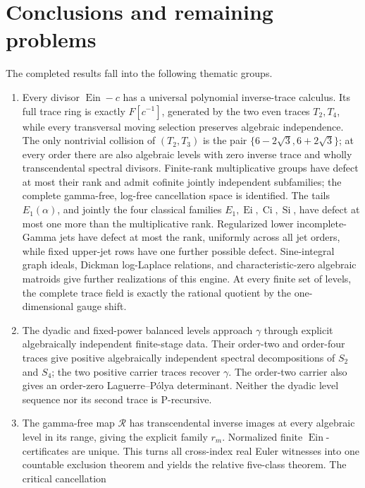 \documentclass[11pt]{article}
\theoremstyle{definition}
\theoremstyle{remark}
\newcommand{\Ein}{\operatorname{Ein}}
\newcommand{\Ei}{\operatorname{Ei}}
\newcommand{\Ci}{\operatorname{Ci}}
\begin{document}
\section{Conclusions and remaining problems}
\label{sec:conclusion}

The completed results fall into the following thematic groups.
\begin{enumerate}[label=\textup{(\arabic*)}]
 \item Every divisor \(\Ein-c\) has a universal polynomial inverse-trace
 calculus.  Its full trace ring is exactly \(F[c^{-1}]\), generated by the
 two even traces \(T_2,T_4\), while every transversal moving selection
 preserves algebraic independence.  The only nontrivial collision of
 \((T_2,T_3)\) is the pair \(\{6-2\sqrt3,6+2\sqrt3\}\); at every order
 there are also algebraic levels with zero inverse trace and wholly
 transcendental spectral divisors.  Finite-rank multiplicative groups have
 defect at most their rank and admit cofinite jointly independent
 subfamilies; the complete gamma-free, log-free cancellation space is
 identified.  The tails \(E_1(\alpha)\), and jointly the four classical
 families \(E_1,\Ei,\Ci,\operatorname{Si}\), have defect at most one more
 than the multiplicative rank.  Regularized lower incomplete-Gamma jets
 have defect at most the rank, uniformly across all jet orders, while fixed
 upper-jet rows have one further possible defect.  Sine-integral graph
 ideals, Dickman log-Laplace relations, and characteristic-zero algebraic
 matroids give further realizations of this engine.  At every finite set of
 levels, the complete trace field is exactly the rational quotient by the
 one-dimensional gauge shift.
 \item The dyadic and fixed-power balanced levels approach \(\gamma\) through
 explicit algebraically independent finite-stage data.  Their order-two
 and order-four traces give positive algebraically independent spectral
 decompositions of \(S_2\) and \(S_4\); the two positive carrier traces
 recover \(\gamma\).  The order-two carrier also gives an order-zero
 Laguerre--P\'olya determinant.  Neither the dyadic level sequence nor its
 second trace is P-recursive.
 \item The gamma-free map \(\mathscr R\) has transcendental inverse images at
 every algebraic level in its range, giving the explicit family \(r_m\).
 Normalized finite \(\Ein\)-certificates are unique.  This turns all
 cross-index real Euler witnesses into one countable exclusion theorem and
 yields the relative five-class theorem.  The critical cancellation

\end{enumerate}
\end{document}
